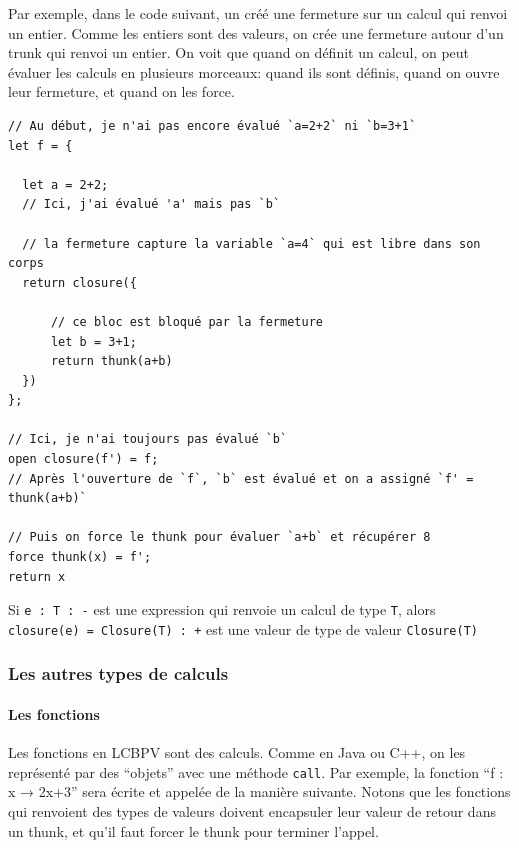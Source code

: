 \documentclass[12pt]{article}
\begin{document}
Par exemple, dans le code suivant, un créé une fermeture sur un calcul
qui renvoi un entier. Comme les entiers sont des valeurs, on crée une
fermeture autour d'un trunk qui renvoi un entier. On voit que quand on
définit un calcul, on peut évaluer les calculs en plusieurs morceaux:
quand ils sont définis, quand on ouvre leur fermeture, et quand on les
force.

\begin{verbatim}
// Au début, je n'ai pas encore évalué `a=2+2` ni `b=3+1`
let f = {

  let a = 2+2;
  // Ici, j'ai évalué 'a' mais pas `b`
    
  // la fermeture capture la variable `a=4` qui est libre dans son corps 
  return closure({
  
      // ce bloc est bloqué par la fermeture
      let b = 3+1;
      return thunk(a+b)
  })
};
  
// Ici, je n'ai toujours pas évalué `b`
open closure(f') = f;
// Après l'ouverture de `f`, `b` est évalué et on a assigné `f' = thunk(a+b)` 
  
// Puis on force le thunk pour évaluer `a+b` et récupérer 8
force thunk(x) = f';
return x
\end{verbatim}

Si \texttt{e\ :\ T\ :\ -} est une expression qui renvoie un calcul de
type \texttt{T}, alors \texttt{closure(e)\ =\ Closure(T)\ :\ +} est une
valeur de type de valeur \texttt{Closure(T)}

\hypertarget{les-autres-types-de-calculs}{%
      \subsubsection*{Les autres types de
            calculs}\label{les-autres-types-de-calculs}}

\hypertarget{les-fonctions}{%
      \paragraph*{Les fonctions}\label{les-fonctions}}

Les fonctions en LCBPV sont des calculs. Comme en Java ou C++, on les
représenté par des ``objets'' avec une méthode \texttt{call}. Par
exemple, la fonction ``f : x → 2x+3'' sera écrite et appelée de la
manière suivante. Notons que les fonctions qui renvoient des types de
valeurs doivent encapsuler leur valeur de retour dans un thunk, et qu'il
faut forcer le thunk pour terminer l'appel.
\end{document}
